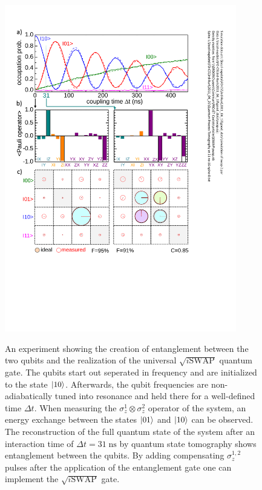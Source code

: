 \begin{figure}
	\centering
		\includegraphics[width=0.9\textwidth]{./material/papers/iswap/submission1/Dewes_Figure2}
	\label{fig:iSwap2}
	\caption{An experiment showing the creation of entanglement between the two qubits and the realization of the universal $\sqrt{i\mathrm{SWAP}}$ quantum gate. The qubits start out seperated in frequency and are initialized to the state $\left| 10 \right>$. Afterwards, the qubit frequencies are non-adiabatically tuned into resonance and held there for a well-defined time $\Delta t$. When measuring the $\sigma_z^1 \otimes \sigma_z^2$ operator of the system, an energy exchange between the states $\left| 01 \right>$ and $\left| 10 \right>$ can be observed. The reconstruction of the full quantum state of the system after an interaction time of $\Delta t = 31 \; \mathrm{ns} $ by quantum state tomography shows entanglement between the qubits. By adding compensating $\sigma_z^{1,2}$ pulses after the application of the entanglement gate one can implement the $\sqrt{i\mathrm{SWAP}}$ gate.}
\end{figure}

